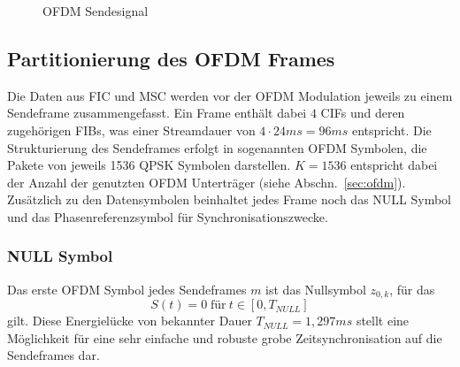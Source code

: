 \begin{figure}
\begin{center}
\end{center}
\caption{OFDM Sendesignal}
\label{chart:transmission_frame}
\end{figure}

\subsection{Partitionierung des OFDM Frames}
Die Daten aus FIC und MSC werden vor der OFDM Modulation jeweils zu einem Sendeframe zusammengefasst. Ein Frame enthält dabei $4$ CIFs und deren zugehörigen FIBs, was einer Streamdauer von $4\cdot24ms = 96ms$ entspricht. Die Strukturierung des Sendeframes erfolgt in sogenannten OFDM Symbolen, die Pakete von jeweils 1536 QPSK Symbolen darstellen. $K=1536$ entspricht dabei der Anzahl der genutzten OFDM Unterträger (siehe Abschn.~\ref{sec:ofdm}). 
Zusätzlich zu den Datensymbolen beinhaltet jedes Frame noch das NULL Symbol und das Phasenreferenzsymbol für Synchronisationszwecke.

\subsubsection{NULL Symbol}
Das erste OFDM Symbol jedes Sendeframes $m$ ist das Nullsymbol $z_{0,k}$, für das
\begin{equation}
S(t) = 0 \; \text{für} \: t \in [0, T_{NULL}]
\end{equation}
gilt. Diese Energielücke von bekannter Dauer $T_{NULL} = 1,297ms$ stellt eine Möglichkeit für eine sehr einfache und robuste grobe Zeitsynchronisation auf die Sendeframes dar.

